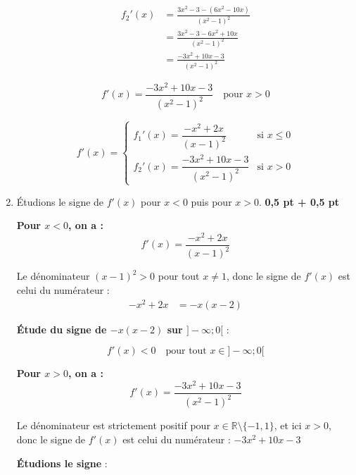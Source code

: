 \documentclass[12pt,a4paper]{article}
\begin{document}
\begin{enumerate}
\[
\begin{aligned}
f_2'(x) &= \frac{3x^2 - 3 - (6x^2 - 10x)}{(x^2 - 1)^2} \\
&= \frac{3x^2 - 3 - 6x^2 + 10x}{(x^2 - 1)^2} \\
&= \frac{-3x^2 + 10x - 3}{(x^2 - 1)^2}
\end{aligned}
\]

\[
\boxed{f'(x) = \dfrac{-3x^2 + 10x - 3}{(x^2 - 1)^2} \quad \text{pour } x > 0}
\]

\begin{resultbox}
\[
f'(x) = 
\begin{cases}
f_{1}'(x)=\dfrac{-x^2 + 2x}{(x - 1)^2} & \text{si } x \leq 0 \\
f_{2}'(x) = \dfrac{-3x^2 + 10x - 3}{(x^2 - 1)^2} & \text{si } x > 0
\end{cases}
\]
\end{resultbox}

    \item Étudions le signe de \( f'(x) \) pour \( x < 0 \) puis pour \( x > 0 \). \hfill \textbf{0{,}5 pt + 0{,}5 pt}

\textbf{Pour \( x < 0 \), on a :}
\[
f'(x) = \frac{-x^2 + 2x}{(x - 1)^2}
\]

Le dénominateur \( (x - 1)^2 > 0 \) pour tout \( x \neq 1 \), donc le signe de \( f'(x) \) est celui du numérateur :
\[
\begin{aligned}
-x^2 + 2x &= -x(x - 2)
\end{aligned}
\]

\textbf{Étude du signe de \( -x(x - 2) \) sur \( ]-\infty ; 0[ \)} :

\begin{center}
\end{center}	

\[
\boxed{f'(x) < 0 \quad \text{pour tout } x \in ]-\infty ; 0[}
\]

\bigskip

\textbf{Pour \( x > 0 \), on a :}
\[
f'(x) = \frac{-3x^2 + 10x - 3}{(x^2 - 1)^2}
\]

Le dénominateur est strictement positif pour \( x \in \mathbb{R} \setminus \{-1, 1\} \), et ici \( x > 0 \), donc le signe de \( f'(x) \) est celui du numérateur :
\(
 -3x^2 + 10x - 3
\)

\textbf{Étudions le signe } :


\end{enumerate}
\end{document}
